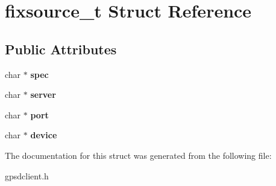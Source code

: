 \hypertarget{structfixsource__t}{\section{fixsource\-\_\-t \-Struct \-Reference}
\label{structfixsource__t}
}
\subsection*{\-Public \-Attributes}
\begin{DoxyCompactItemize}
\item 
\hypertarget{structfixsource__t_aa8f66f0a9162015718316594c9de52d5}{char $\ast$ {\bfseries spec}}\label{structfixsource__t_aa8f66f0a9162015718316594c9de52d5}

\item 
\hypertarget{structfixsource__t_af24f24efa72dea7c8ea975c72c9a7917}{char $\ast$ {\bfseries server}}\label{structfixsource__t_af24f24efa72dea7c8ea975c72c9a7917}

\item 
\hypertarget{structfixsource__t_af04ef819fcccbe801b3ea31476b0414f}{char $\ast$ {\bfseries port}}\label{structfixsource__t_af04ef819fcccbe801b3ea31476b0414f}

\item 
\hypertarget{structfixsource__t_a16b3c53d6e80c47733331a2bcbf8d2e7}{char $\ast$ {\bfseries device}}\label{structfixsource__t_a16b3c53d6e80c47733331a2bcbf8d2e7}

\end{DoxyCompactItemize}


\-The documentation for this struct was generated from the following file\-:\begin{DoxyCompactItemize}
\item 
gpsdclient.\-h\end{DoxyCompactItemize}
